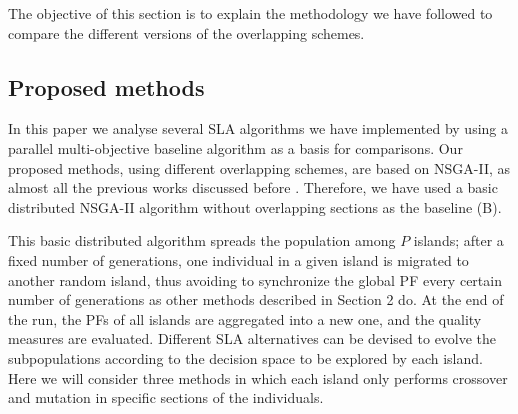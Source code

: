 \documentclass[preprint]{elsarticle}
\begin{document}
The objective of this section is to explain the methodology we have followed to
compare the different versions of the overlapping schemes.

\subsection{Proposed methods}
In this paper we analyse several SLA algorithms we have
implemented by using a parallel multi-objective baseline algorithm
as a basis for comparisons. Our proposed methods, using different overlapping schemes, %
are based on NSGA-II, as almost all the previous works discussed
before
\cite{Dorronsoro13superlinear,Durillo08masterslave,Hiroyasu07discussion,Deb03distributed,Xiao03specialized,Wang09parallel,Martens13asynchronous}. %
Therefore, we have used a basic distributed NSGA-II algorithm without
overlapping sections as the baseline (B).

This basic distributed algorithm spreads the population among $P$
islands; after a fixed number of generations,
one individual in a given island is migrated to another random island,
thus avoiding to synchronize the global PF every
certain number of generations as other methods described in Section 2
do. At the end of the run, the PFs of all islands are
aggregated into a new one, and the quality measures are evaluated. 
Different  SLA alternatives can be devised to evolve the
subpopulations according to the decision space to be explored by each
island. Here we will consider three methods in which each island only
performs crossover and mutation in specific sections of the
individuals. 



%
\end{document}

